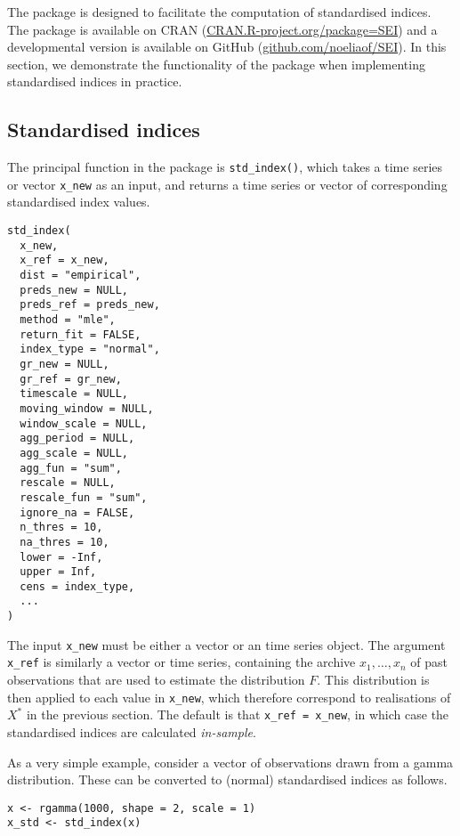 The  package is designed to facilitate the computation of standardised indices. The package is available on CRAN (\url{CRAN.R-project.org/package=SEI}) and a developmental version is available on GitHub (\url{github.com/noeliaof/SEI}). In this section, we demonstrate the functionality of the  package when implementing standardised indices in practice.

\hypertarget{standardised-indices}{%
\subsection{Standardised indices}\label{standardised-indices}}

The principal function in the  package is \texttt{std\_index()}, which takes a time series or vector \texttt{x\_new} as an input, and returns a time series or vector of corresponding standardised index values.

\begin{verbatim}
std_index(
  x_new,
  x_ref = x_new,
  dist = "empirical",
  preds_new = NULL,
  preds_ref = preds_new,
  method = "mle",
  return_fit = FALSE,
  index_type = "normal",
  gr_new = NULL,
  gr_ref = gr_new,
  timescale = NULL,
  moving_window = NULL,
  window_scale = NULL,
  agg_period = NULL,
  agg_scale = NULL,
  agg_fun = "sum",
  rescale = NULL,
  rescale_fun = "sum",
  ignore_na = FALSE,
  n_thres = 10,
  na_thres = 10,
  lower = -Inf,
  upper = Inf,
  cens = index_type,
  ...
)
\end{verbatim}

The input \texttt{x\_new} must be either a vector or an  time series object. The argument \texttt{x\_ref} is similarly a vector or time series, containing the archive \(x_{1}, \dots, x_{n}\) of past observations that are used to estimate the distribution \(F\). This distribution is then applied to each value in \texttt{x\_new}, which therefore correspond to realisations of \(X^{*}\) in the previous section. The default is that \texttt{x\_ref\ =\ x\_new}, in which case the standardised indices are calculated \emph{in-sample}.

As a very simple example, consider a vector of observations drawn from a gamma distribution. These can be converted to (normal) standardised indices as follows.

\begin{verbatim}
x <- rgamma(1000, shape = 2, scale = 1)
x_std <- std_index(x)
\end{verbatim}

